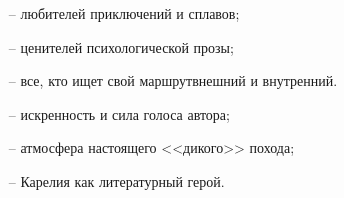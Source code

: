{
\begin{enumerate}[leftmargin=1cm, itemsep=0pt, topsep=0pt]
	\item[--] любителей приключений и сплавов;
	\item[--] ценителей психологической прозы;
	\item[--] все, кто ищет свой маршрут\mdash внешний и внутренний.	
\end{enumerate}

\begin{enumerate}[leftmargin=1cm, itemsep=0pt, topsep=0pt]
	\item[--] искренность и сила голоса автора;
	\item[--] атмосфера настоящего <<дикого>> похода;
	\item[--] Карелия как литературный герой.	
\end{enumerate}


%
%

}

\clearpage               

\thispagestyle{plain}   %
%
%

